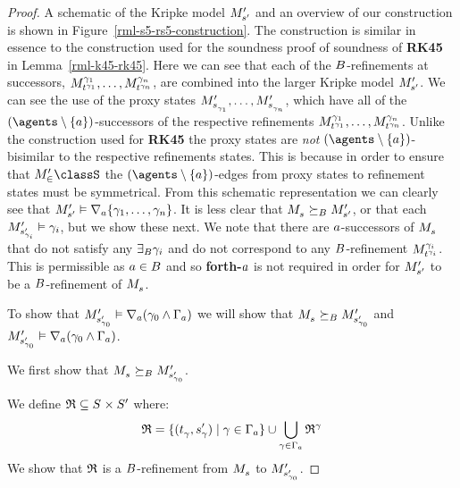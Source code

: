 \begin{proof}
A schematic of the Kripke model $\kPModelP{\kStateSP}$ and an overview of our construction is shown in Figure~\ref{rml-s5-rs5-construction}.
The construction is similar in essence to the construction used for the soundness proof of soundness of {\bf RK45} in Lemma~\ref{rml-k45-rk45}.
Here we can see that each of the $\agentsB$-refinements at successors, $\kPModel[\gamma_1]{\kStateT[\gamma_1]}, \dots, \kPModel[\gamma_n]{\kStateT[\gamma_n]}$, are combined into the larger Kripke model $\kPModelP{\kStateSP}$.
We can see the use of the proxy states $\kPModelP{\kStateS_{\gamma_1}}, \dots, \kPModelP{\kStateS_{\gamma_n}}$, which have all of the $(\agents \setminus \{\agentA\})$-successors of the respective refinements $\kPModel[\gamma_1]{\kStateT[\gamma_1]}, \dots, \kPModel[\gamma_n]{\kStateT[\gamma_n]}$.
Unlike the construction used for {\bf RK45} the proxy states are {\em not} $(\agents \setminus \{\agentA\})$-bisimilar to the respective refinements states.
This is because in order to ensure that $\kPModelP \in \classS$ the $(\agents \setminus \{\agentA\})$-edges from proxy states to refinement states must be symmetrical.
From this schematic representation we can clearly see that $\kPModelP{\kStateSP} \entails \coversA \{\gamma_1, \dots, \gamma_n\}$.
It is less clear that $\kPModel{\kStateS} \simulatesBs \kPModelP{\kStateSP}$, or that each $\kPModelP{\kStateSP_{\gamma_i}} \entails \gamma_i$, but we show these next.
We note that there are $\agentA$-successors of $\kPModel{\kStateS}$ that do not satisfy any $\somerefsBs \gamma_i$ and do not correspond to any $\agentsB$-refinement $\kPModel[\gamma_i]{\kStateT[\gamma_i]}$.
This is permissible as $\agentA \in \agentsB$ and so {\bf forth-$\agentA$} is not required in order for $\kPModelP{\kStateSP}$ to be a $\agentsB$-refinement of $\kPModel{\kStateS}$.

To show that $\kPModelP{\kStateSP_{\gamma_0}} \entails \coversA (\gamma_0 \land \Gamma_\agentA)$ we will show that $\kPModel{\kStateS} \simulatesBs \kPModelP{\kStateSP_{\gamma_0}}$ and $\kPModelP{\kStateSP_{\gamma_0}} \entails \coversA (\gamma_0 \land \Gamma_\agentA)$.

We first show that $\kPModel{\kStateS} \simulatesBs \kPModelP{\kStateSP_{\gamma_0}}$.

We define $\refinement \subseteq \kStates \times \kStatesP$ where:
$$
\refinement = \{(\kStateT_\gamma, \kStateSP_\gamma) \mid \gamma \in \Gamma_\agentA\} \cup \bigcup_{\gamma \in \Gamma_\agentA} \refinement^\gamma
$$
We show that $\refinement$ is a $\agentsB$-refinement from $\kPModel{\kStateS}$ to $\kPModelP{\kStateSP_{\gamma_0}}$.


\end{proof}
